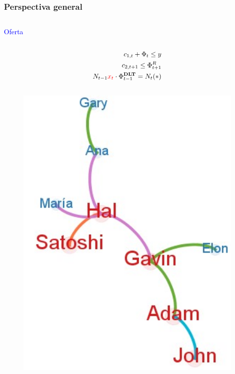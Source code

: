 
\begin{frame}
\frametitle{Perspectiva general}
\begin{columns}

    \begin{column}{0.50\textwidth}
    \vspace{-5pt}
    \begin{block}{\textcolor{blue}{Oferta}}
        \begin{column}{0.1\textwidth}
        \vspace{-10pt} %
            \tiny
            \begin{align*}
            c_{1,t}+\Phi_t \le y\\
            c_{2,t+1}\le\Phi_{t+1}^R\\
            N_{t-1}\textcolor{red}{x_t} \cdot \Phi_{t-1}^{\textbf{DLT}}=N_t(*)
            \end{align*}
        \end{column}
        \begin{column}{0.35\textwidth}  
            \begin{figure}[H]
            \begin{center}
             \includegraphics[width=1\textwidth]{images/C2/c2_simul_red5.jpg}
             \end{center}
            \end{figure}
            \end{column}
    \end{block}
    

\end{column}
\end{columns}
\end{frame}

